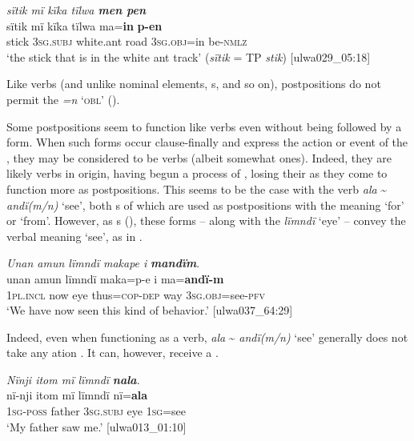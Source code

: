 \ea%
    \label{ex:otherwc:29}
          \textit{sïtik mï kïka tïlwa \textbf{men pen}}\\
\gll    sïtik  mï      kïka    tïlwa  ma=\textbf{in}      \textbf{p-en}\\
    stick  \textsc{3sg.subj}  white.ant  road  3\textsc{sg.obj}=in  be\textsc{{}-nmlz}\\
\glt `the stick that is in the white ant track’ (\textit{sïtik} = TP \textit{stik}) [ulwa029\_05:18]
\z

Like verbs (and unlike nominal elements, s, and so on), postpositions do not permit the  \textit{=n} ‘\textsc{obl}’ ().

  Some postpositions seem to function like verbs even without being followed by a  form. When such forms occur clause-finally and express the action or event of the , they may be considered to be verbs (albeit somewhat  ones). Indeed, they are likely verbs in origin, having begun a process of , losing their  as they come to function more as postpositions. This seems to be the case with the  verb \textit{ala} {\textasciitilde} \textit{andï(m/n)} ‘see’, both s of which are used as postpositions with the meaning ‘for’ or ‘from’. However, as s (), these forms -- along with the  \textit{lïmndï} ‘eye’ -- convey the verbal meaning ‘see’, as in .

\ea%
    \label{ex:otherwc:30}
          \textit{Unan amun lïmndï makape i} \textbf{\textit{mandïm}}.\\
\gll unan    amun  lïmndï  maka=p-e    i    ma=\textbf{andï-m}\\
    1\textsc{pl.incl}  now  eye    thus=\textsc{cop-dep}  way  3\textsc{sg.obj}=see-\textsc{pfv}\\
\glt `We have now seen this kind of behavior.’ [ulwa037\_64:29]
\z

Indeed, even when functioning as a verb, \textit{ala} {\textasciitilde} \textit{andï(m/n)} ‘see’ generally does not take any  ation . It can, however, receive a  .

\ea%
    \label{ex:otherwc:31}
          \textit{Nïnji itom mï lïmndï} \textbf{\textit{nala}}.\\
\gll nï-nji    itom  mï      lïmndï  nï=\textbf{ala}\\
    1\textsc{sg-poss}  father  \textsc{3sg.subj}  eye    1\textsc{sg}=see\\
\glt `My father saw me.’ [ulwa013\_01:10]
\z


